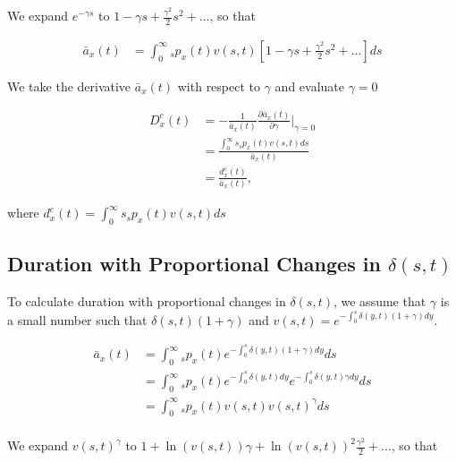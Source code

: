 \documentclass[12pt]{article}
\begin{document}
We expand $e^{-\gamma s}$ to $1-\gamma s+\frac{\gamma^2}{2} s^{2} +...$, so that


\begin{equation}\label{eq:DurationConst1}
\begin{split}
\bar{a}_{x}(t) &= \int_0^\infty {}_sp_x(t) {v}(s,t)[1-\gamma s+\frac{\gamma^2}{2} s^{2} +...]ds
\end{split}
\end{equation}

We take the derivative $\bar{a}_{x}(t)$ with respect to $\gamma$ and evaluate $\gamma=0$


\begin{equation}\label{eq:DurationConst2}
\begin{split}
{D}^{c}_x(t)&=-\frac{1}{\bar{a}_x(t)}\frac{\partial \bar{a}_x(t)}{\partial \gamma} \bigg\rvert_{\gamma=0}\\
              &= \frac{\int_0^\infty s {}_sp_x(t) {v}(s,t)ds}{\bar{a}_x(t)} \\
              &= \frac{{d}^{c}_x(t)}{\bar{a}_x(t)},
\end{split}
\end{equation}

where ${d}^{c}_x(t)=\int_0^\infty s {}_sp_x(t) {v}(s,t)ds$



\subsection{Duration with Proportional Changes in $\delta(s,t)$} \label{sec:DurProp}

To calculate duration with proportional changes in $\delta(s,t)$, we assume that $\gamma$ is a small number such that $\delta(s,t)(1+\gamma)$ and  ${v}(s,t)=e^{-\int_0^{s}  \delta(y,t)(1+\gamma)dy}$.


\begin{equation}\label{eq:DurationProp1}
\begin{split}
\bar{a} _x(t) &= \int_0^\infty {}_sp_x(t) e^{-\int_0^{s}\delta(y,t)(1+\gamma)dy}ds \\
&= \int_0^\infty {}_sp_x(t) e^{-\int_0^{s}\delta(y,t)dy}e^{-\int_0^{s}\delta(y,t)\gamma dy}ds \\
&= \int_0^\infty {}_sp_x(t) v(s,t)v(s,t)^{\gamma}ds \\
\end{split}
\end{equation}


We expand $v(s,t)^{\gamma}$ to $1+\ln(v(s,t)) \gamma+{\ln(v(s,t))}^2 \frac{\gamma^2}{2}+...$, so that
\end{document}
